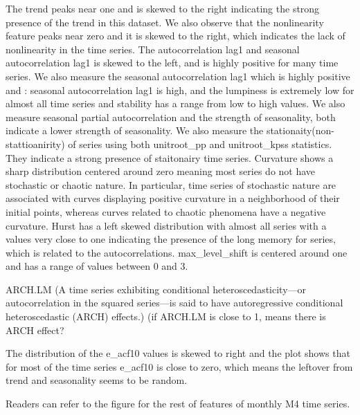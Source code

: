 \documentclass[]{elsarticle} %
\begin{document}
The trend peaks near one and is skewed to the right indicating the
strong presence of the trend in this dataset. We also observe that the
nonlinearity feature peaks near zero and it is skewed to the right,
which indicates the lack of nonlinearity in the time series. The
autocorrelation lag1 and seasonal autocorrelation lag1 is skewed to the
left, and is highly positive for many time series. We also measure the
seasonal autocorrelation lag1 which is highly positive and : seasonal
autocorrelation lag1 is high, and the lumpiness is extremely low for
almost all time series and stability has a range from low to high
values. We also measure seasonal partial autocorrelation and the
strength of seasonality, both indicate a lower strength of seasonality.
We also measure the stationaity(non-stattioanirity) of series using both
unitroot\_pp and unitroot\_kpss statistics. They indicate a strong
presence of staitonairy time series. Curvature shows a sharp
distribution centered around zero meaning most series do not have
stochastic or chaotic nature. In particular, time series of stochastic
nature are associated with curves displaying positive curvature in a
neighborhood of their initial points, whereas curves related to chaotic
phenomena have a negative curvature. Hurst has a left skewed
distribution with almost all series with a values very close to one
indicating the presence of the long memory for series, which is related
to the autocorrelations. max\_level\_shift is centered around one and
has a range of values between 0 and 3.

ARCH.LM (A time series exhibiting conditional heteroscedasticity---or
autocorrelation in the squared series---is said to have autoregressive
conditional heteroscedastic (ARCH) effects.) (if ARCH.LM is close to 1,
means there is ARCH effect?

The distribution of the e\_acf10 values is skewed to right and the plot
shows that for most of the time series e\_acf10 is close to zero, which
means the leftover from trend and seasonality seems to be random.

Readers can refer to the figure for the rest of features of monthly M4
time series.
\end{document}
